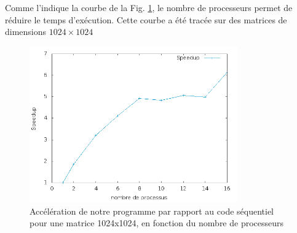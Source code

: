 Comme l'indique la courbe de la Fig. \ref{fig:sp-proc}, le nombre de processeurs permet de réduire le temps d'exécution. Cette courbe a été tracée sur des matrices de dimensions $1024\times1024$
\begin{figure}[H]
\centering
\includegraphics[width=0.8\textwidth]{sp-proc.png}
\caption{Accélération de notre programme par rapport au code séquentiel pour une matrice 1024x1024, en fonction du nombre de processeurs}
\label{fig:sp-proc}
\end{figure}

